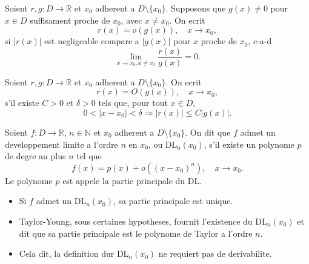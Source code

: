 \begin{definition}
Soient $r,g:D\to \mathbb{R}$ et $x_{0}$ adherent a $D\setminus \{ x_{0} \}$. Supposons que $g(x)\neq 0$ pour $x \in D$ suffisament proche de $x_0$, avec $x\neq x_{0}$. On ecrit
$$
r(x)=o(g(x)),\quad x\to x_{0},
$$
si $|r(x)|$ est negligeable compare a $|g(x)|$ pour $x$ proche de $x_{0}$, c-a-d
$$
\lim_{ x \to x_{0},x\neq x_{0} } \frac{r(x)}{g(x)}=0. 
$$
\end{definition}
\begin{definition}
Soient $r,g:D\to \mathbb{R}$ et $x_{0}$ adherent a $D\setminus \{ x_{0} \}$. On ecrit 
$$
r(x)=O(g(x)),\quad x\to x_{0},
$$
s'il existe $C>0$ et $\delta>0$ tels que, pour tout $x \in D$,
$$
0<|x-x_{0}|<\delta \Rightarrow |r(x)|\le C|g(x)|.
$$
\end{definition}

\begin{definition}
Soient $f:D\to \mathbb{R}$, $n\in \mathbb{N}$ et $x_{0}$ adherent a $D\setminus \{ x_{0} \}$. On dit que $f$ admet un developpement limite a l'ordre $n$ en $x_{0}$, ou $\mathrm{DL_{n}}(x_{0})$, s'il existe un polynome $p$ de degre au plus $n$ tel que
$$
f(x)=p(x)+o((x-x_{0})^{n}),\quad x\to x_{0}.
$$
Le polynome $p$ est appele la partie principale du DL.
\end{definition}
\begin{remark}
\begin{itemize}
\item Si $f$ admet un $\mathrm{DL}_{n}(x_{0})$, sa partie principale est unique.
\item Taylor-Young, sous certaines hypotheses, fournit l'existence du $\mathrm{DL}_{n}(x_{0})$ et dit que sa partie principale est le polynome de Taylor a l'ordre $n$.
\item Cela dit, la definition dur $\mathrm{DL}_{n}(x_{0})$ ne requiert pas de derivabilite.
\end{itemize}
\end{remark}